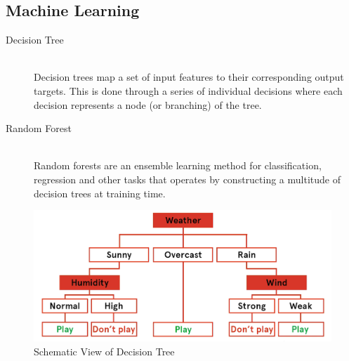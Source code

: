 \documentclass{beamer}
\begin{document}
\subsection{Machine Learning}
\begin{frame}
    \begin{description}
        \item[Decision Tree] \hfill \\ Decision trees map a set of input features to their corresponding output targets. This is done through a series of individual decisions where each decision represents a node (or branching) of the tree. 
        \\[0.2in]
        \pause
        \item[Random Forest] \hfill \\ Random forests are an ensemble learning method for classification, regression and other tasks that operates by constructing a multitude of decision trees at training time. 
    \end{description}

    \end{frame}


\begin{frame}
    \begin{figure}
        \includegraphics[scale=0.15]{img/decision_tree2.png}
        \caption{Schematic View of Decision Tree}
    \end{figure}
    \end{frame}
\end{document}
